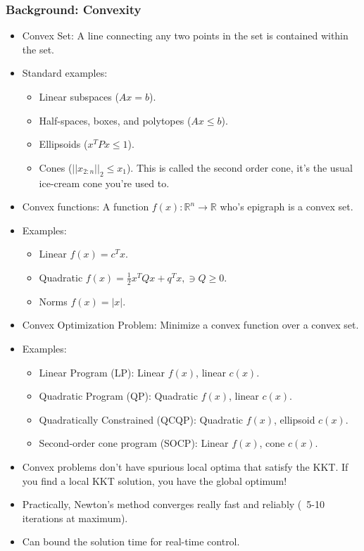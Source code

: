 \subsubsection{Background: Convexity}
\begin{itemize}
    \item Convex Set: A line connecting any two points in the set is contained within the set.
    \item Standard examples:
    \begin{itemize}
        \item Linear subspaces ($Ax=b$). 
        \item Half-spaces, boxes, and polytopes ($Ax\leq b$). 
        \item Ellipsoids ($x^T P x \leq 1$).
        \item Cones ($||x_{2:n}||_2 \leq x_1$). This is called the second order cone, it's the usual ice-cream cone you're used to. 
    \end{itemize}
    \item Convex functions: A function $f(x): \mathbb{R}^n \longrightarrow \mathbb{R}$ who's epigraph is a convex set. 
    \item Examples: 
    \begin{itemize}
        \item Linear $f(x) = c^T x$.
        \item Quadratic $f(x) = \frac{1}{2} x^T Q x + q^T x, \ni Q \geq 0$.
        \item Norms $f(x) = |x|$.
    \end{itemize}
    \item Convex Optimization Problem: Minimize a convex function over a convex set. 
    \item Examples:
    \begin{itemize}
        \item Linear Program (LP): Linear $f(x)$, linear $c(x)$.
        \item Quadratic Program (QP): Quadratic $f(x)$, linear $c(x)$. 
        \item Quadratically Constrained (QCQP): Quadratic $f(x)$, ellipsoid $c(x)$. 
        \item Second-order cone program (SOCP): Linear $f(x)$, cone $c(x)$. 
    \end{itemize}
    \item Convex problems don't have spurious local optima that satisfy the KKT. If you find a local KKT solution, you have the global optimum!
    \item Practically, Newton's method converges really fast and reliably (~5-10 iterations at maximum). 
    \item Can bound the solution time for real-time control.
\end{itemize}